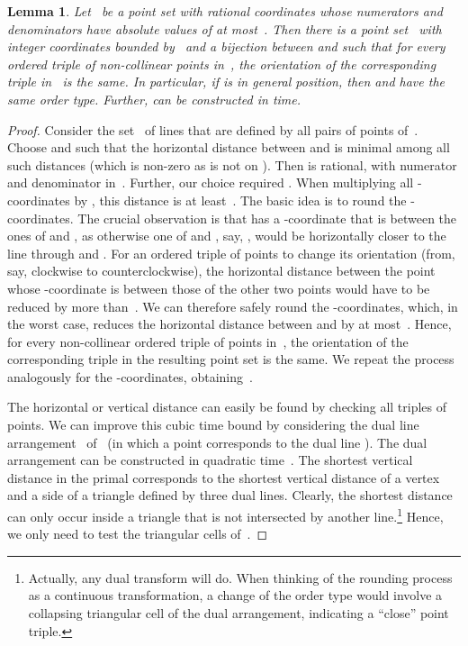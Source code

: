 \documentclass[a4paper,11pt]{article}
\newtheorem{lemma}[theorem]{Lemma}
\begin{document}
\begin{lemma}\label{lem_integer_coordinates}
Let~ be a point set with rational coordinates whose numerators and denominators have absolute values of at most~.
Then there is a point set~ with integer coordinates bounded by~ and a bijection between  and  such that for every ordered triple of non-collinear points in~, the orientation of the corresponding triple in~ is the same.
In particular, if  is in general position, then  and  have the same order type.
Further,  can be constructed in  time.
\end{lemma}
\begin{proof}
Consider the set~ of lines that are defined by all pairs of points of~.
Choose  and  such that the horizontal distance  between  and  is minimal among all such distances (which is non-zero as  is not on ). Then  is rational, with numerator and denominator in~.
Further, our choice required .
When multiplying all -coordinates by , this distance is at least~.
The basic idea is to round the -coordinates.
The crucial observation is that  has a -coordinate that is between the ones of  and , as otherwise one of  and , say, , would be horizontally closer to the line through  and .
For an ordered triple of points to change its orientation (from, say, clockwise to counterclockwise), the horizontal distance between the point whose -coordinate is between those of the other two points would have to be reduced by more than~.
We can therefore safely round the -coordinates, which, in the worst case, reduces the horizontal distance between  and  by at most~.
Hence, for every non-collinear ordered triple of points in~, the orientation of the corresponding triple in the resulting point set is the same.
We repeat the process analogously for the -coordinates, obtaining~.

The horizontal or vertical distance  can easily be found by checking all triples of points.
We can improve this cubic time bound by considering the dual line arrangement~ of~ (in which a point  corresponds to the dual line ).
The dual arrangement can be constructed in quadratic time~\cite{power_of_duality,constructing_arrangements}.
The shortest vertical distance in the primal corresponds to the shortest vertical distance of a vertex and a side of a triangle defined by three dual lines.
Clearly, the shortest distance can only occur inside a triangle that is not intersected by another line.\footnote{Actually, any dual transform will do.
When thinking of the rounding process as a continuous transformation, a change of the order type would involve a collapsing triangular cell of the dual arrangement, indicating a ``close'' point triple.}
Hence, we only need to test the  triangular cells of~.
\end{proof}
\end{document}
